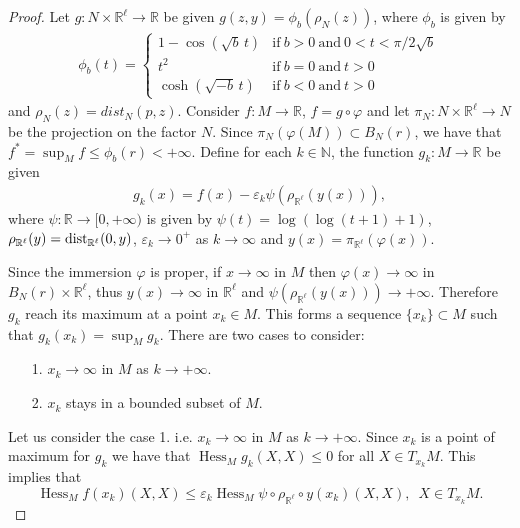 \documentclass[a4paper]{amsart}
\begin{document}
\begin{proof}Let $ g : N\times\mathbb{R}^{\ell} \rightarrow \mathbb{R} $ be given $ g(z,y) = \phi_{b}(\rho_{N}(z)) $, where $\phi_{b}$ is given by
\begin{eqnarray}
\phi_{b}(t) =
\left\{\begin{array}{ll}
1 - \cos(\sqrt{b}\,t) & \mbox{if} \ b > 0 \ \mbox{and} \ 0 < t < \pi/2\sqrt{b} \\
t^2 & \mbox{if} \ b = 0 \ \mbox{and} \ t > 0 \\
\cosh(\sqrt{-b}\,t) & \mbox{if} \ b < 0 \ \mbox{and} \ t > 0
\end{array}\right.
\end{eqnarray}
and $ \rho_{N}(z) = dist_{N}(p,z) $.  Consider $ f : M \rightarrow \mathbb{R} $, $ f = g\circ\varphi $ and let $ \pi_{N} : N\times\mathbb{R}^{\ell} \rightarrow N $ be the projection on the factor $ N $. Since $ \pi_{N}(\varphi(M)) \subset B_{N}(r) $, we have that $ f^{*} = \sup_{M}f \leq \phi_{b}(r) < + \infty $. Define for each $ k \in \mathbb{N} $, the function $ g_{k} : M \rightarrow \mathbb{R} $ be given
\begin{eqnarray}
g_{k}(x) = f(x) - \varepsilon_{k}\psi(\rho_{\mathbb{R}^{\ell}}(y(x))),
\end{eqnarray}
where $ \psi : \mathbb{R} \rightarrow [0,+\infty) $ is given by $\psi(t) = \log(\log(t+1)+1) $, $\rho_{\mathbb{R}^{\ell}}(y)={\rm dist}_{\mathbb{R}^{\ell}}(0, y)$, $\varepsilon_k\to 0^+$ as $k\to \infty$
and $ y(x) = \pi_{\mathbb{R}^{\ell}}(\varphi(x)) $.

Since the immersion $ \varphi $ is proper, if $ x \rightarrow \infty $ in $M$  then $\varphi (x)\to \infty$ in $B_{N}(r)\times\mathbb{R}^{\ell}$, thus $y(x)\to \infty$ in $\mathbb{R}^{\ell}$ and  $ \psi(\rho_{\mathbb{R}^{\ell}}(y(x))) \rightarrow +\infty $. Therefore $g_{k}$ reach its maximum at a point $x_{k}\in M$. This forms a sequence $\{ x_k \}\subset M $ such that $ g_{k}(x_k) = \sup_{M}g_k $.  There are two cases to consider:
 \begin{itemize}\item[1.]$x_k\to \infty$ in $M$ as $k\to +\infty$. \item[2.] $x_k$ stays in a bounded subset of $M$. \end{itemize}
  Let us consider the case 1. i.e. $x_k\to \infty$ in $M$ as $k\to +\infty$.
Since $x_{k}$ is a point of maximum for $g_{k}$ we have that $\operatorname{Hess}_{M}g_{k}(X,X)\leq 0$ for all $X\in T_{x_{k}}M$. This implies that \begin{equation}\operatorname{Hess}_{M}f(x_{k})(X,X)\leq \varepsilon_{k}\operatorname{Hess}_{M}\psi\circ \rho_{\mathbb{R}^{\ell}}\circ y(x_{k})(X,X),\,\,\,  X\in T_{x_{k}}M.\label{eqHessiano}\end{equation} 


\end{proof}
\end{document}
